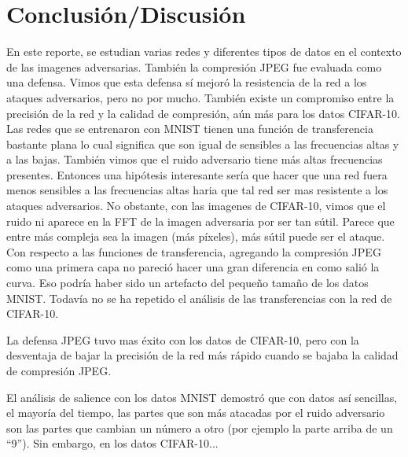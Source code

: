 \section{Conclusión/Discusión}
En este reporte, se estudian varias redes y diferentes tipos de datos en el contexto de las imagenes adversarias. También la compresión JPEG fue evaluada como una defensa. Vimos que esta defensa sí mejoró la resistencia de la red a los ataques adversarios, pero no por mucho. También existe un compromiso entre la precisión de la red y la calidad de compresión, aún más para los datos CIFAR-10. Las redes que se entrenaron con MNIST tienen una función de transferencia bastante plana lo cual significa que son igual de sensibles a las frecuencias altas y a las bajas. También vimos que el ruido adversario tiene más altas frecuencias presentes. Entonces una hipótesis interesante sería que hacer que una red fuera menos sensibles a las frecuencias altas haria que tal red ser mas resistente a los ataques adversarios. No obstante, con las imagenes de CIFAR-10, vimos que el ruido ni aparece en la FFT de la imagen adversaria por ser tan sútil. Parece que entre más compleja sea la imagen (más píxeles), más sútil puede ser el ataque. Con respecto a las funciones de transferencia, agregando la compresión JPEG como una primera capa no pareció hacer una gran diferencia en como salió la curva. Eso podría haber sido un artefacto del pequeño tamaño de los datos MNIST. Todavía no se ha repetido el análisis de las transferencias con la red de CIFAR-10.

La defensa JPEG tuvo mas éxito con los datos de CIFAR-10, pero con la desventaja de bajar la precisión de la red más rápido cuando se bajaba la calidad de compresión JPEG.

El análisis de salience con los datos MNIST demostró que con datos así sencillas, el mayoría del tiempo, las partes que son más atacadas por el ruido adversario son las partes que cambian un número a otro (por ejemplo la parte arriba de un ``9''). Sin embargo, en los datos CIFAR-10...